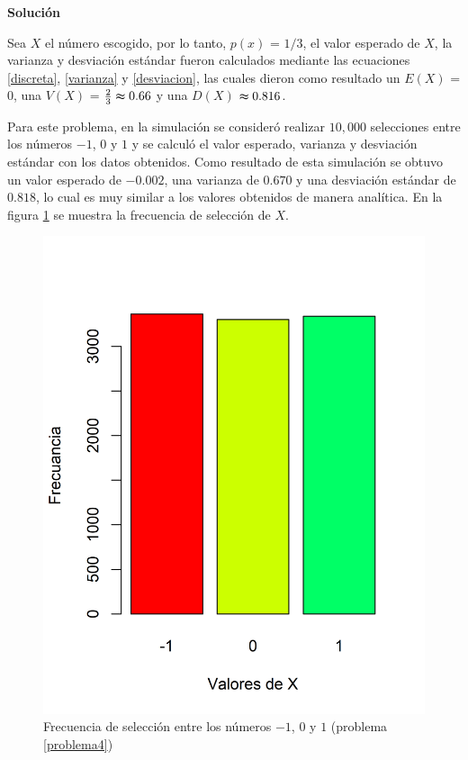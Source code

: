 \documentclass{article}
\begin{document}
\noindent \textbf{Solución}

\noindent Sea $X$ el número escogido, por lo tanto, $p(x)$ = $1/3$, el valor esperado de $X$, la varianza y desviación estándar fueron calculados mediante las ecuaciones \ref{discreta}, \ref{varianza} y \ref{desviacion}, las cuales dieron como resultado un $E{(X)}$ = $0$, una $V{(X)}$ = $\frac{2}{3} \thickapprox 0.66$ y una $D{(X)}$ $\thickapprox 0.816$.

Para este problema, en la simulación se consideró realizar $10,000$ selecciones entre los números $-1$, $0$ y $1$ y se calculó el valor esperado, varianza y desviación estándar con los datos obtenidos. Como resultado de esta simulación se obtuvo un valor esperado de $-0.002$, una varianza de $0.670$ y una desviación estándar de $0.818$, lo cual es muy similar a los valores obtenidos de manera analítica. En la figura \ref{seleccion} se muestra la frecuencia de selección de $X$.


\begin{figure}[h]
\centering
    \includegraphics[scale=0.7]{Figures/seleccion.png}
    \caption{Frecuencia de selección entre los números $-1$, $0$ y $1$ (problema \ref{problema4})}
    \label{seleccion}
\end{figure}





\end{document}

